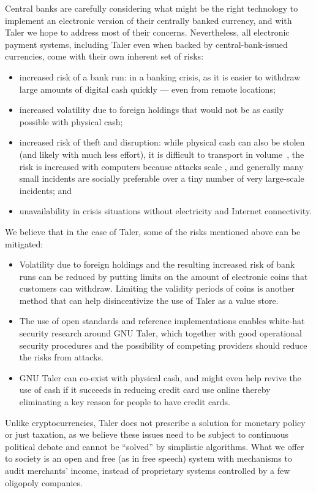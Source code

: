 Central banks are carefully considering what might be the right
technology to implement an electronic version of their centrally
banked currency, and with Taler we hope to address most of their concerns.
Nevertheless, all electronic payment systems, including Taler even
when backed by central-bank-issued currencies, come with their own
inherent set of risks:~\cite{riksbank2017riksbank}

\begin{itemize}
  \item increased risk of a bank run: in a banking crisis,
    as it is easier to withdraw large amounts of digital
    cash quickly --- even from remote locations;
  \item increased volatility due to foreign holdings that would
    not be as easily possible with physical cash;
  \item increased risk of theft and disruption: while physical
    cash can also be stolen (and likely with much less effort), it is
    difficult to transport in volume~\cite{force2015money}, the
    risk is increased with computers because attacks scale \cite{hammer2018billion}, and
    generally many small incidents are socially preferable over a
    tiny number of very large-scale incidents; and
  \item unavailability in crisis situations without electricity and Internet
    connectivity.
\end{itemize}


We believe that in the case of Taler, some of the risks mentioned
above can be mitigated:
\begin{itemize}
 \item Volatility due to foreign holdings and the resulting increased
   risk of bank runs can be reduced by putting limits on the amount of
   electronic coins that customers can withdraw.  Limiting the
   validity periods of coins is another method that can help
   disincentivize the use of Taler as a value store.
 \item The use of open standards and reference implementations enables
   white-hat security research around GNU Taler, which together with
   good operational security procedures and the possibility of
   competing providers should reduce the risks from attacks.
 \item GNU Taler can co-exist with physical cash, and might even
   help revive the use of cash if it succeeds in reducing credit
   card use online thereby eliminating a key reason for people to
   have credit cards.
\end{itemize}

Unlike cryptocurrencies, Taler does not prescribe a solution for monetary
policy or just taxation, as we believe these issues need to be subject to
continuous political debate and cannot be ``solved'' by simplistic algorithms.
What we offer to society is an open and free (as in free speech) system with
mechanisms to audit merchants' income, instead of proprietary systems
controlled by a few oligopoly companies.

